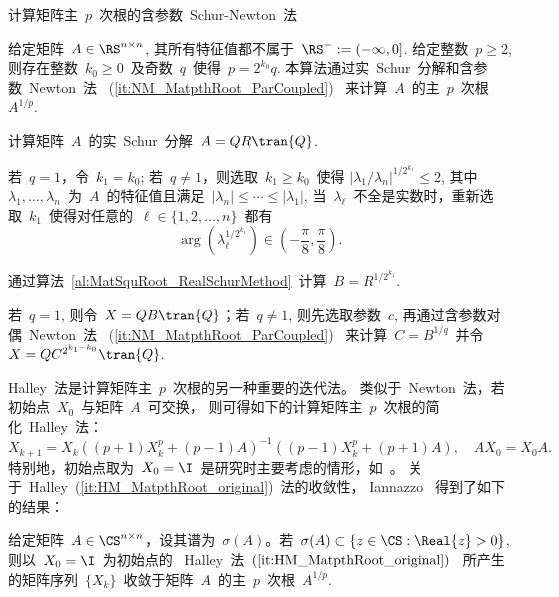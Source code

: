 \begin{algorithm}[h!]
\caption{计算矩阵主~$p$~次根的含参数~Schur-Newton~法~\cite[算法~
3.3]{GuoHigham2006}} \label{al:MatpthRoot_ParSchurNewton_GuoHig06}
给定矩阵~$A\in\RS^{n\times n}$, 其所有特征值都不属于~$\RS^- :=
(-\infty,0]$. 给定整数~$p\geq 2$, 则存在整数~$k_0 \geq
0$~及奇数~$q$~使得~$p = 2^{k_0}q$.
本算法通过实~Schur~分解和含参数~Newton~法~
(\ref{it:NM_MatpthRoot_ParCoupled})~
来计算~$A$~的主~$p$~次根~$A^{1/p}$.
\begin{list}{.}{
\setlength{\rightmargin}{0em}\setlength{\leftmargin}{1.2em}}
\item
计算矩阵~$A$~的实~Schur~分解~$A = QR\tran{Q}$.
\item
若~$q=1$，令~$k_1 = k_0$; 若~$q\neq1$，则选取~$k_1\geq k_0$~使得
$|\lambda_1/\lambda_n|^{1/2^{k_1}}\leq 2$, 其中~$\lambda_1,\ldots,
\lambda_n$~为~$A$~的特征值且满足~$|\lambda_n|\leq \cdots \leq
|\lambda_1|$,
当~$\lambda_\ell$~不全是实数时，重新选取~$k_1$~使得对任意的~$\ell
\in \{1,2,\ldots,n\}$~都有
$$
\arg(\lambda_\ell^{1/2^{k_1}}) \in
\left(-\frac{\pi}{8},\frac{\pi}{8}\right).
$$
\item
通过算法~\ref{al:MatSquRoot_RealSchurMethod}~计算~$B =
R^{1/{2^{k_1}}}$.
\item
若~$q=1$, 则令~$X = QB\tran{Q}$；若~$q\neq 1$, 则先选取参数~$c$,
再通过含参数对偶~Newton~法~ (\ref{it:NM_MatpthRoot_ParCoupled})~
来计算~$C = B^{1/q}$~并令~$X = QC^{2^{k_1-k_0}}\tran{Q}$.
\end{list}
\end{algorithm}


Halley~法是计算矩阵主~$p$~次根的另一种重要的迭代法。
类似于~Newton~法，若初始点~$X_0$~与矩阵~$A$~可交换，
则可得如下的计算矩阵主~$p$~次根的简化~Halley~法：
\begin{equation}
\label{it:HM_MatpthRoot_original} X_{k+1} = X_k\left((p+1)X_k^p +
(p-1)A\right)^{-1} \left((p-1)X_k^p + (p+1)A\right), \quad AX_0 =
X_0A.
\end{equation}
特别地，初始点取为~$X_0 =
\I$~是研究时主要考虑的情形，如~\cite{Iannazzo2008,Guo2010,Lin2010}。
关于~Halley~(\ref{it:HM_MatpthRoot_original})~法的收敛性， Iannazzo
\cite{Iannazzo2008}~得到了如下的结果：

\begin{theorem}
\label{th:Conv_HM_Ian08} 给定矩阵~$A\in\CS^{n\times
n}$，设其谱为~$\sigma(A)$。若~$\sigma(A) \subset \{z\in \CS:
\Real{z}>0\}$, 则以~$X_0 = \I$~为初始点的
~Halley~法~$(\ref{it:HM_MatpthRoot_original})$~
所产生的矩阵序列~$\{X_k\}$~收敛于矩阵~$A$~的主~$p$~次根~$A^{1/p}$.
\end{theorem}


